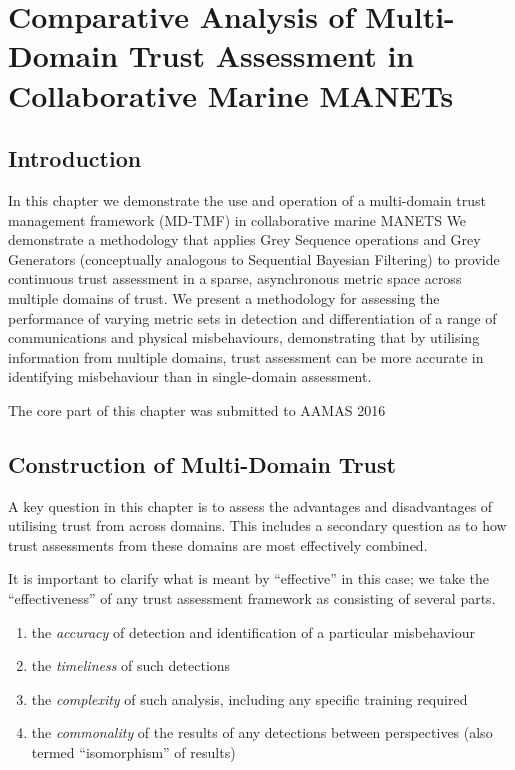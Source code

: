 \def\ChapterTitle{Comparative Analysis of Multi-Domain Trust Assessment in Collaborative Marine MANETs}

\ifx\ifthesis\undefined

\else
\chapter{\ChapterTitle}
\label{Chapter\thechapter}
\fi

\section{Introduction}



In this chapter we demonstrate the use and operation of a multi-domain trust management framework (MD-TMF) in collaborative marine MANETS
We demonstrate a methodology that applies Grey Sequence operations and Grey Generators (conceptually analogous to Sequential Bayesian Filtering) to provide continuous trust assessment in a sparse, asynchronous metric space across multiple domains of trust.
We present a methodology for assessing the performance of varying metric sets in detection and differentiation of a range of communications and physical misbehaviours, demonstrating that by utilising information from multiple domains, trust assessment can be more accurate in identifying misbehaviour than in single-domain assessment.

The core part of this chapter was submitted to AAMAS 2016

\section{Construction of Multi-Domain Trust}

A key question in this chapter is to assess the advantages and disadvantages of utilising trust from across domains. 
This includes a secondary question as to how trust assessments from these domains are most effectively combined. 

It is important to clarify what is meant by ``effective'' in this case; we take the ``effectiveness'' of any trust assessment framework as consisting of several parts.

\begin{enumerate}
  \item the \emph{accuracy} of detection and identification of a particular misbehaviour
  \item the \emph{timeliness} of such detections
  \item the \emph{complexity} of such analysis, including any specific training required
  \item the \emph{commonality} of the results of any detections between perspectives (also termed ``isomorphism'' of results)
\end{enumerate}




